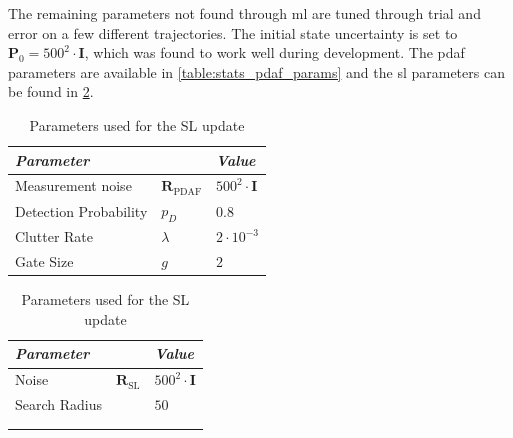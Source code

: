 The remaining parameters not found through \acrshort{ml} are tuned through trial and error on a few different trajectories.
The initial state uncertainty is set to $\boldsymbol{P}_0 = 500^2 \cdot \boldsymbol{I}$, which was found to work well during development. The \acrshort{pdaf} parameters are available in \cref{table:stats_pdaf_params} and the \acrshort{sl} parameters can be found in \cref{table:stats_sl_params}.

\begin{table}[h]
    \centering
    \begin{subtable}{0.49\textwidth}
        \begin{tabular}{|lll|}
            \textit{\textbf{Parameter}} &                                & \textit{\textbf{Value}}     \\ \hline
            Measurement noise           & $\boldsymbol{R}_{\text{PDAF}}$ & $500^2 \cdot \boldsymbol{I}$ \\
            Detection Probability       & $p_D$                          & $0.8$                       \\
            Clutter Rate                & $\lambda$                      & $2 \cdot 10^{-3}$           \\
            Gate Size                   & $g$                            & $2$
        \end{tabular}
        \caption{Parameters used for \acrshort{pdaf} update}
        \label{table:stats_pdaf_params}
    \end{subtable}
    \begin{subtable}{0.49 \textwidth}

        \centering
        \begin{tabular}{|lll|}
            \textit{\textbf{Parameter}} &                              & \textit{\textbf{Value}}       \\ \hline
            Noise                       & $\boldsymbol{R}_{\text{SL}}$ & $500^2 \cdot \boldsymbol{I}$ \\
            Search Radius               &                              & $50$                         \\
                                        &                              &                               \\
                                        &                              &
        \end{tabular}
        \caption{Parameters used for the SL update}
        \label{table:stats_sl_params}
    \end{subtable}
\end{table}



